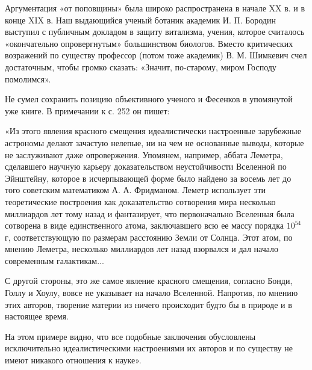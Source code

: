 Аргументация «от поповщины» была широко распространена в начале XX в. и в конце
XIX в. Наш выдающийся ученый ботаник академик И. П. Бородин выступил с
публичным докладом в защиту витализма, учения, которое считалось «окончательно
опровергнутым» большинством биологов. Вместо критических возражений по существу
профессор (потом тоже академик) В. М. Шимкевич счел достаточным, чтобы громко
сказать: «Значит, по-старому, миром Господу помолимся».

Не сумел сохранить позицию объективного ученого и Фесенков в упомянутой уже
книге. В примечании к с. 252 он пишет:

«Из этого явления красного смещения идеалистически настроенные зарубежные
астрономы делают зачастую нелепые, ни на чем не основанные выводы, которые не
заслуживают даже опровержения. Упомянем, например, аббата Леметра, сделавшего
научную карьеру доказательством неустойчивости Вселенной по Эйнштейну, которое
в исчерпывающей форме было найдено за восемь лет до того советским математиком
А. А. Фридманом. Леметр использует эти теоретические построения как
доказательство сотворения мира несколько миллиардов лет тому назад и
фантазирует, что первоначально Вселенная была сотворена в виде единственного
атома, заключавшего всю ее массу порядка $10^{54}$ г, соответствующую по размерам
расстоянию Земли от Солнца. Этот атом, по мнению Леметра, несколько миллиардов
лет назад взорвался и дал начало современным галактикам...

С другой стороны, это же самое явление красного смещения, согласно Бонди, Голлу
и Хоулу, вовсе не указывает на начало Вселенной. Напротив, по мнению этих
авторов, творение материи из ничего происходит будто бы в природе и в настоящее
время.

На этом примере видно, что все подобные заключения обусловлены исключительно
идеалистическими настроениями их авторов и по существу не имеют никакого
отношения к науке».

